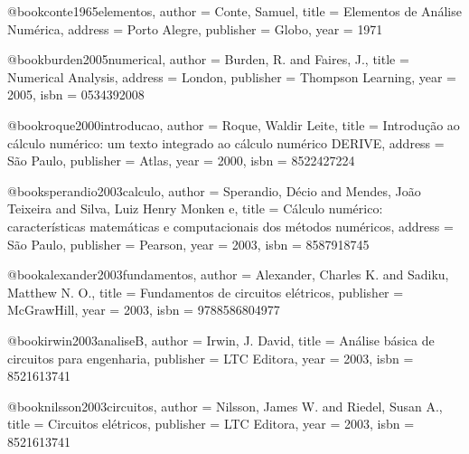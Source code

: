 @book{conte1965elementos,
  author = {Conte, Samuel},
  title = {Elementos de Análise Numérica},
  address = {Porto Alegre},
  publisher = {Globo},
  year = {1971} %
}

@book{burden2005numerical,
  author = {Burden, R. and Faires, J.},
  title = {Numerical Analysis},
  address = {London},
  publisher = {Thompson Learning},
  year = {2005},
  isbn = {0534392008}%
}

@book{roque2000introducao,
  author = {Roque, Waldir Leite},
  title = {Introdução ao cálculo numérico: um texto integrado ao cálculo numérico DERIVE},
  address = {São Paulo},
  publisher = {Atlas},
  year = {2000},
  isbn = {8522427224}
}

@book{sperandio2003calculo,
  author = {Sperandio, Décio and Mendes, João Teixeira and Silva, Luiz Henry Monken e},
  title = {Cálculo numérico: características matemáticas e computacionais dos métodos numéricos},
  address = {São Paulo},
  publisher = {Pearson},
  year = {2003},
  isbn = {8587918745}
}

%

@book{alexander2003fundamentos,
  author = {Alexander, Charles K. and Sadiku, Matthew N. O.},
  title = {Fundamentos de circuitos elétricos},
  publisher = {McGrawHill},
  year = {2003},
  isbn = {9788586804977}
}

@book{irwin2003analiseB,
  author = {Irwin, J. David},
  title = {Análise básica de circuitos para engenharia},
  publisher = {LTC Editora},
  year = {2003},
  isbn = {8521613741}
}

@book{nilsson2003circuitos,
  author = {Nilsson, James W. and Riedel, Susan A.},
  title = {Circuitos elétricos},
  publisher = {LTC Editora},
  year = {2003},
  isbn = {8521613741}
}

